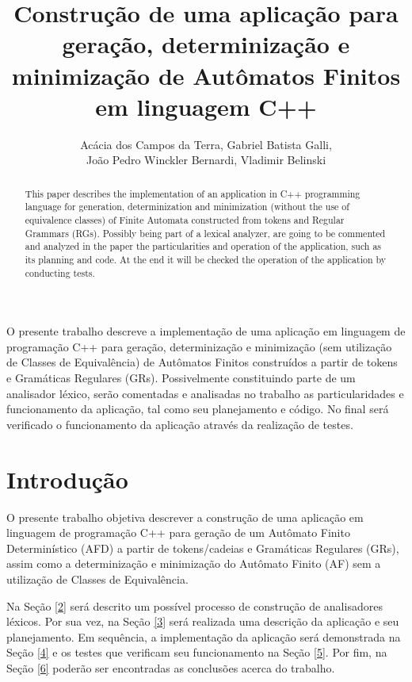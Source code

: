 \documentclass[12pt]{article}
\title{Construção de uma aplicação para geração, determinização e minimização de Autômatos Finitos em linguagem C++}
\author{Acácia dos Campos da Terra\inst{1}, Gabriel Batista Galli\inst{1},\\ João Pedro Winckler Bernardi\inst{1}, Vladimir Belinski\inst{1} }
\begin{document}
 

\maketitle

\begin{abstract}
 This paper describes the implementation of an application in C++ programming language for generation, determinization and minimization (without the use of equivalence classes) of Finite Automata constructed from tokens and Regular Grammars (RGs). Possibly being part of a lexical analyzer, are going to be commented and analyzed in the paper the particularities and operation of the application, such as its planning and code. At the end it will be checked the operation of the application by conducting tests.
\end{abstract}
     
\begin{resumo}
 O presente trabalho descreve a implementação de uma aplicação em linguagem de programação C++ para geração, determinização e minimização (sem utilização de Classes de Equivalência) de Autômatos Finitos construídos a partir de tokens e Gramáticas Regulares (GRs). Possivelmente constituindo parte de um analisador léxico, serão comentadas e analisadas no trabalho as particularidades e funcionamento da aplicação, tal como seu planejamento e código. No final será verificado o funcionamento da aplicação através da realização de testes.

\end{resumo}


\section{Introdução}

O presente trabalho objetiva descrever a construção de uma aplicação em linguagem de programação C++ para geração de um Autômato Finito Determinístico (AFD) a partir de tokens/cadeias e Gramáticas Regulares (GRs), assim como a determinização e minimização do Autômato Finito (AF) sem a utilização de Classes de Equivalência.

Na Seção \ref{2} será descrito um possível processo de construção de analisadores léxicos. Por sua vez, na Seção \ref{3} será realizada uma descrição da aplicação e seu planejamento. Em sequência, a implementação da aplicação será demonstrada na Seção \ref{4} e os testes que verificam seu funcionamento na Seção \ref{5}. Por fim, na Seção \ref{6} poderão ser encontradas as conclusões acerca do trabalho.
\end{document}
